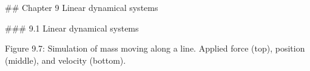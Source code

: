 

## Chapter 9 Linear dynamical systems

### 9.1 Linear dynamical systems

Figure 9.7: Simulation of mass moving along a line. Applied force (top), position (middle), and velocity (bottom).

